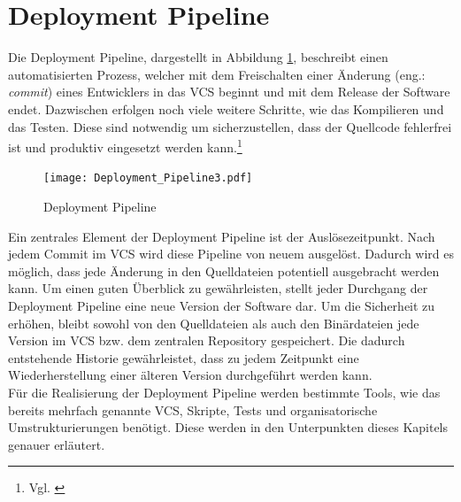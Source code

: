 \section{Deployment Pipeline}
Die Deployment Pipeline, dargestellt in Abbildung \ref{img:depl_pipe}, beschreibt einen automatisierten Prozess, welcher mit dem Freischalten einer Änderung (eng.: \textit{commit}) eines Entwicklers in das \acs{VCS} beginnt und mit dem Release der Software endet. Dazwischen erfolgen noch viele weitere Schritte, wie das Kompilieren und das Testen. Diese sind notwendig um sicherzustellen, dass der Quellcode fehlerfrei ist und produktiv eingesetzt werden kann.\footnote{Vgl. \cite[Kapitel 5]{continuous_dev}}
\begin{figure}[H]
    \centering
    \vspace{-10pt}
    \texttt{[image: Deployment\_Pipeline3.pdf]}
    \vspace{-20pt}
    \caption{Deployment Pipeline} \cite[Seite 4 (angepasst)]{continuous_dev}
  \label{img:depl_pipe}
\end{figure}

Ein zentrales Element der Deployment Pipeline ist der Auslösezeitpunkt. Nach jedem Commit im \acs{VCS} wird diese Pipeline von neuem ausgelöst. Dadurch wird es möglich, dass jede Änderung in den Quelldateien potentiell ausgebracht  werden kann. Um einen guten Überblick zu gewährleisten, stellt jeder Durchgang der Deployment Pipeline eine neue Version der Software dar. Um die Sicherheit zu erhöhen, bleibt sowohl von den Quelldateien als auch den Binärdateien jede Version im \acs{VCS} bzw. dem zentralen Repository gespeichert. Die dadurch entstehende Historie gewährleistet, dass zu jedem Zeitpunkt eine Wiederherstellung einer älteren Version durchgeführt werden kann.\\
Für die Realisierung der Deployment Pipeline werden bestimmte Tools, wie das bereits mehrfach genannte \acs{VCS}, Skripte, Tests und organisatorische Umstrukturierungen  benötigt. Diese werden in den Unterpunkten dieses Kapitels genauer erläutert.


